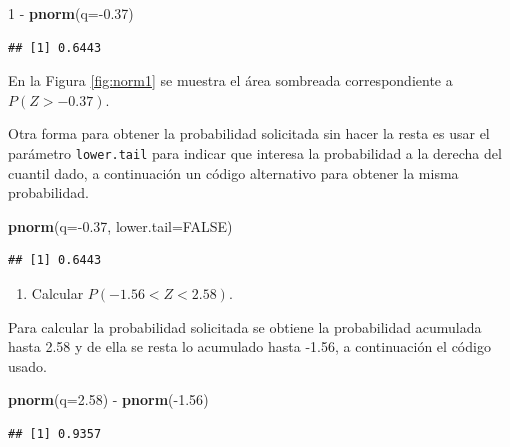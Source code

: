 \documentclass[10pt,]{krantz}
\makeatletter
\newenvironment{Shaded}{\begin{snugshade}}{\end{snugshade}}
\newcommand{\KeywordTok}[1]{\textcolor[rgb]{0.13,0.29,0.53}{\textbf{{#1}}}}
\newcommand{\DataTypeTok}[1]{\textcolor[rgb]{0.13,0.29,0.53}{{#1}}}
\newcommand{\DecValTok}[1]{\textcolor[rgb]{0.00,0.00,0.81}{{#1}}}
\newcommand{\FloatTok}[1]{\textcolor[rgb]{0.00,0.00,0.81}{{#1}}}
\newcommand{\StringTok}[1]{\textcolor[rgb]{0.31,0.60,0.02}{{#1}}}
\newcommand{\OtherTok}[1]{\textcolor[rgb]{0.56,0.35,0.01}{{#1}}}
\newcommand{\NormalTok}[1]{{#1}}
\providecommand{\tightlist}{%
  \setlength{\itemsep}{0pt}\setlength{\parskip}{0pt}}
\newenvironment{kframe}{%
\medskip{}
\setlength{\fboxsep}{.8em}
 \def\at@end@of@kframe{}%
 \ifinner\ifhmode%
  \def\at@end@of@kframe{\end{minipage}}%
  \begin{minipage}{\columnwidth}%
 \fi\fi%
 \def\FrameCommand##1{\hskip\@totalleftmargin \hskip-\fboxsep
 \colorbox{shadecolor}{##1}\hskip-\fboxsep
     \hskip-\linewidth \hskip-\@totalleftmargin \hskip\columnwidth}%
 \MakeFramed {\advance\hsize-\width
   \@totalleftmargin\z@ \linewidth\hsize
   \@setminipage}}%
 {\par\unskip\endMakeFramed%
 \at@end@of@kframe}
\renewenvironment{Shaded}{\begin{kframe}}{\end{kframe}}
\makeatother
\begin{document}
\begin{Shaded}
\begin{Highlighting}[]
\DecValTok{1} \NormalTok{-}\StringTok{ }\KeywordTok{pnorm}\NormalTok{(}\DataTypeTok{q=}\NormalTok{-}\FloatTok{0.37}\NormalTok{)}
\end{Highlighting}
\end{Shaded}

\begin{verbatim}
## [1] 0.6443
\end{verbatim}

En la Figura \ref{fig:norm1} se muestra el área sombreada
correspondiente a \(P(Z > -0.37)\).

Otra forma para obtener la probabilidad solicitada sin hacer la resta es
usar el parámetro \texttt{lower.tail} para indicar que interesa la
probabilidad a la derecha del cuantil dado, a continuación un código
alternativo para obtener la misma probabilidad.

\begin{Shaded}
\begin{Highlighting}[]
\KeywordTok{pnorm}\NormalTok{(}\DataTypeTok{q=}\NormalTok{-}\FloatTok{0.37}\NormalTok{, }\DataTypeTok{lower.tail=}\OtherTok{FALSE}\NormalTok{)}
\end{Highlighting}
\end{Shaded}

\begin{verbatim}
## [1] 0.6443
\end{verbatim}

\begin{enumerate}
\def\labelenumi{\arabic{enumi})}
\setcounter{enumi}{2}
\tightlist
\item
  Calcular \(P(-1.56 < Z < 2.58)\).
\end{enumerate}

Para calcular la probabilidad solicitada se obtiene la probabilidad
acumulada hasta 2.58 y de ella se resta lo acumulado hasta -1.56, a
continuación el código usado.

\begin{Shaded}
\begin{Highlighting}[]
\KeywordTok{pnorm}\NormalTok{(}\DataTypeTok{q=}\FloatTok{2.58}\NormalTok{) -}\StringTok{ }\KeywordTok{pnorm}\NormalTok{(-}\FloatTok{1.56}\NormalTok{)}
\end{Highlighting}
\end{Shaded}

\begin{verbatim}
## [1] 0.9357
\end{verbatim}
\end{document}
